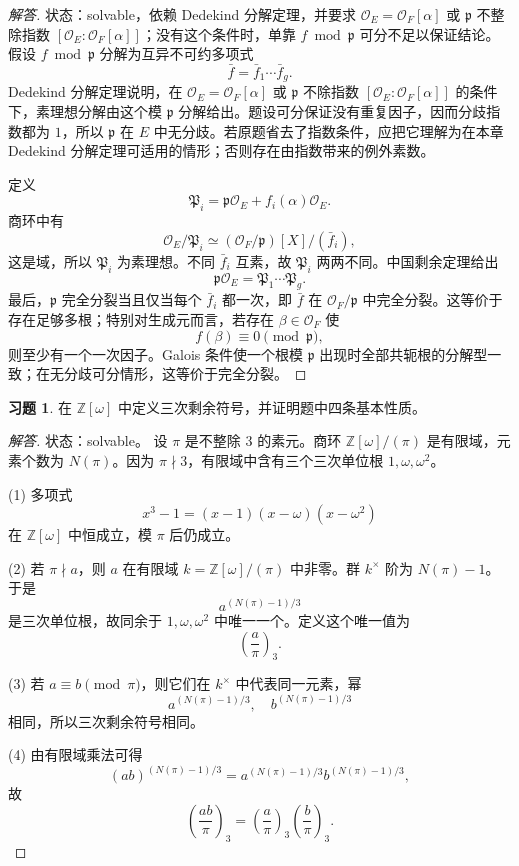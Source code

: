 \documentclass[11pt,a4paper,openany]{ctexbook}
\numberwithin{equation}{chapter}
\newcommand{\Z}{\mathbb{Z}}
\newcommand{\OF}{\mathcal{O}_F}
\theoremstyle{plain}
\theoremstyle{definition}
\newtheorem{exercise}[theorem]{习题}
\theoremstyle{remark}
\begin{document}
\begin{proof}[解答]
状态：solvable，依赖 Dedekind 分解定理，并要求 $\mathcal O_E=\OF[\alpha]$ 或 $\mathfrak p$ 不整除指数 $[\mathcal O_E:\OF[\alpha]]$；没有这个条件时，单靠 $f\bmod\mathfrak p$ 可分不足以保证结论。
假设 $f\bmod\mathfrak p$ 分解为互异不可约多项式
\[
\bar f=\bar f_1\cdots\bar f_g.
\]
Dedekind 分解定理说明，在 $\mathcal O_E=\OF[\alpha]$ 或 $\mathfrak p$ 不除指数
$[\mathcal O_E:\OF[\alpha]]$ 的条件下，素理想分解由这个模 $\mathfrak p$ 分解给出。题设可分保证没有重复因子，因而分歧指数都为 $1$，所以 $\mathfrak p$ 在 $E$ 中无分歧。若原题省去了指数条件，应把它理解为在本章 Dedekind 分解定理可适用的情形；否则存在由指数带来的例外素数。

定义
\[
\mathfrak P_i=\mathfrak p\mathcal O_E+f_i(\alpha)\mathcal O_E.
\]
商环中有
\[
\mathcal O_E/\mathfrak P_i\simeq
(\OF/\mathfrak p)[X]/(\bar f_i),
\]
这是域，所以 $\mathfrak P_i$ 为素理想。不同 $\bar f_i$ 互素，故 $\mathfrak P_i$ 两两不同。中国剩余定理给出
\[
\mathfrak p\mathcal O_E=\mathfrak P_1\cdots\mathfrak P_g.
\]
最后，$\mathfrak p$ 完全分裂当且仅当每个 $\bar f_i$ 都一次，即 $\bar f$ 在 $\OF/\mathfrak p$ 中完全分裂。这等价于存在足够多根；特别对生成元而言，若存在 $\beta\in\OF$ 使
\[
f(\beta)\equiv0\pmod{\mathfrak p},
\]
则至少有一个一次因子。Galois 条件使一个根模 $\mathfrak p$ 出现时全部共轭根的分解型一致；在无分歧可分情形，这等价于完全分裂。
\end{proof}

\begin{exercise}
在 $\Z[\omega]$ 中定义三次剩余符号，并证明题中四条基本性质。
\end{exercise}

\begin{proof}[解答]
状态：solvable。
设 $\pi$ 是不整除 $3$ 的素元。商环 $\Z[\omega]/(\pi)$ 是有限域，元素个数为 $N(\pi)$。因为 $\pi\nmid3$，有限域中含有三个三次单位根 $1,\omega,\omega^2$。

(1) 多项式
\[
x^3-1=(x-1)(x-\omega)(x-\omega^2)
\]
在 $\Z[\omega]$ 中恒成立，模 $\pi$ 后仍成立。

(2) 若 $\pi\nmid a$，则 $a$ 在有限域 $k=\Z[\omega]/(\pi)$ 中非零。群 $k^\times$ 阶为 $N(\pi)-1$。于是
\[
a^{(N(\pi)-1)/3}
\]
是三次单位根，故同余于 $1,\omega,\omega^2$ 中唯一一个。定义这个唯一值为
\[
\left(\frac a\pi\right)_3.
\]

(3) 若 $a\equiv b\pmod\pi$，则它们在 $k^\times$ 中代表同一元素，幂
\[
a^{(N(\pi)-1)/3},\quad b^{(N(\pi)-1)/3}
\]
相同，所以三次剩余符号相同。

(4) 由有限域乘法可得
\[
(ab)^{(N(\pi)-1)/3}
=a^{(N(\pi)-1)/3}b^{(N(\pi)-1)/3},
\]
故
\[
\left(\frac{ab}{\pi}\right)_3
=\left(\frac a\pi\right)_3\left(\frac b\pi\right)_3.
\]
\end{proof}
\end{document}
